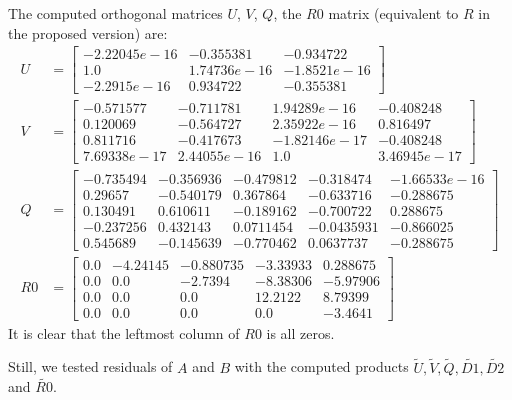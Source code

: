 \begin{example}
{\begin{enumerate}[(1).]
The computed orthogonal matrices $U$, $V$, $Q$, the $R0$ matrix (equivalent to $R$ in the proposed version) are: 
\begin{align*}
    U &= \begin{bmatrix}
     -2.22045e-16 & -0.355381 & -0.934722 \\  
      1.0    &       1.74736e-16 & -1.8521e-16 \\
     -2.2915e-16  &  0.934722  &   -0.355381  
    \end{bmatrix} \\
    V &= \begin{bmatrix}
     -0.571577  &   -0.711781  &    1.94289e-16 & -0.408248 \\   
      0.120069  &   -0.564727   &   2.35922e-16 &  0.816497  \\
      0.811716  &   -0.417673   &  -1.82146e-17 & -0.408248  \\
      7.69338e-17 &  2.44055e-16 &  1.0     &      3.46945e-17
    \end{bmatrix} \\
    Q &= \begin{bmatrix}
     -0.735494 & -0.356936 & -0.479812 &  -0.318474 &  -1.66533e-16 \\
      0.29657 &  -0.540179 &  0.367864 &  -0.633716 &  -0.288675 \\
      0.130491 &  0.610611 & -0.189162 &  -0.700722 &   0.288675 \\  
     -0.237256 &  0.432143 &  0.0711454 & -0.0435931 & -0.866025 \\  
      0.545689 & -0.145639 & -0.770462  &  0.0637737 & -0.288675  
      \end{bmatrix} \\
    R0 &= \begin{bmatrix}
     0.0 & -4.24145 & -0.880735 & -3.33933 &  0.288675 \\
     0.0 &  0.0     & -2.7394   & -8.38306 & -5.97906 \\
     0.0 &  0.0     &  0.0      & 12.2122  &  8.79399 \\
     0.0 &  0.0     &  0.0      &  0.0  & -3.4641
    \end{bmatrix}
\end{align*}
    It is clear that the leftmost column of $R0$ is all zeros.


Still, we tested residuals of $A$ and $B$ with the computed products $\tilde{U}, \tilde{V}, \tilde{Q}, \tilde{D1}, \tilde{D2}$ and $\tilde{R0}$.


\end{enumerate}}
\end{example}
